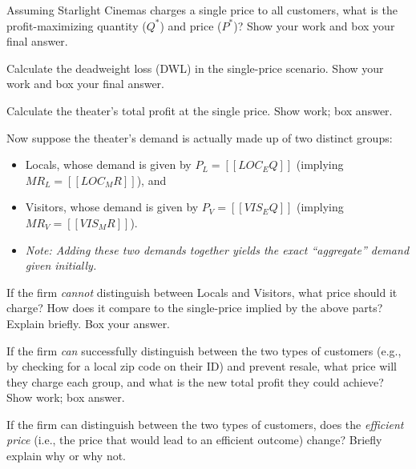 
\begin{subquestions}
  \item Assuming Starlight Cinemas charges a single price to all customers, what is the profit-maximizing quantity ($Q^*$) and price ($P^*$)? Show your work and box your final answer.

  \item Calculate the deadweight loss (DWL) in the single-price scenario. Show your work and box your final answer.

  \item Calculate the theater’s total profit at the single price. Show work; box answer.

  \item Now suppose the theater’s demand is actually made up of two distinct groups:

  \begin{itemize}
    \item Locals, whose demand is given by \textbf{$P_L = [[LOC_EQ]]$} (implying $MR_L = [[LOC_MR]]$), and
    \item Visitors, whose demand is given by \textbf{$P_V = [[VIS_EQ]]$} (implying $MR_V = [[VIS_MR]]$).
    \item \textit{Note: Adding these two demands together yields the exact ``aggregate'' demand given initially.}
  \end{itemize}

  If the firm \textit{cannot} distinguish between Locals and Visitors, what price should it charge? How does it compare to the single-price implied by the above parts? Explain briefly. Box your answer.

  \item If the firm \textit{can} successfully distinguish between the two types of customers (e.g., by checking for a local zip code on their ID) and prevent resale, what price will they charge each group, and what is the new total profit they could achieve? Show work; box answer.

  \item If the firm can distinguish between the two types of customers, does the \textit{efficient price} (i.e., the price that would lead to an efficient outcome) change? Briefly explain why or why not.
\end{subquestions}